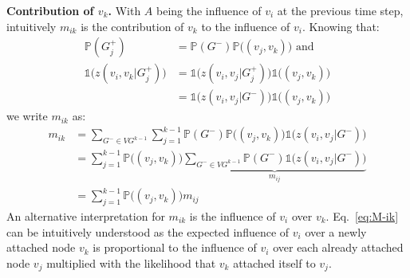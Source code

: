 \textbf{Contribution of $v_k$.}
With $A$ being the influence of $v_i$ at the previous time step, intuitively $m_{ik}$ is the contribution of $v_k$ to the influence of $v_i$.
Knowing that:
\begin{align*}
	\mathds{P}(G_j^+) &= \mathds{P}(G^-)\mathds{P}\big((v_j,v_k)\big) \text{ and } \\
	\mathds{1}\big(z(v_i,v_k|G_j^+)\big) &= \mathds{1}\big(z(v_i,v_j|G^+_j)\big) \mathds{1}\big((v_j,v_k)\big) \\
	 &= \mathds{1}\big(z(v_i,v_j|G^-)\big) \mathds{1}\big((v_j,v_k)\big)
\end{align*}
we write $m_{ik}$ as:
%
\begin{align}
	m_{ik} &= \sum_{G^- \in {VG^{k-1}}} \sum^{k-1}_{j=1} \mathds{P}(G^-)\mathds{P}\big((v_j,v_k)\big) \mathds{1}\big(z(v_i,v_j|G^-)\big) \nonumber \\
           &= \sum^{k-1}_{j=1} \mathds{P}\big((v_j,v_k)\big) \underbrace{ \sum_{G^- \in {VG^{k-1}}} \mathds{P}(G^-) \mathds{1}\big(z(v_i,v_j|G^-)\big)}_{m_{ij}} \nonumber \\
		   &= \sum^{k-1}_{j=1} \mathds{P}\big((v_j,v_k)\big) m_{ij} \label{eq:M-ik}
\end{align}
An alternative interpretation for $m_{ik}$ is the influence of $v_i$ over $v_k$.
Eq.~\eqref{eq:M-ik} can be intuitively understood as the expected influence of $v_i$ over a newly attached node $v_k$ is proportional to the influence of $v_i$ over each already attached node $v_j$ multiplied with the likelihood that $v_k$ attached itself to $v_j$.
